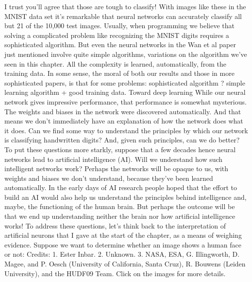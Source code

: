 I trust you'll agree that those are tough to classify! With images like these in the MNIST data set it's remarkable that neural networks can accurately classify all but 21 of the 10,000 test images. Usually, when programming we believe that solving a complicated problem like recognizing the MNIST digits requires a sophisticated algorithm. But even the neural networks in the Wan et al paper just mentioned involve quite simple algorithms, variations on the algorithm we've seen in this chapter. All the complexity is learned, automatically, from the training data. In some sense, the moral of both our results and those in more sophisticated papers, is that for some problems: 
sophisticated algorithm ? simple learning algorithm + good training data. 
Toward deep learning
While our neural network gives impressive performance, that performance is somewhat mysterious. The weights and biases in the network were discovered automatically. And that means we don't immediately have an explanation of how the network does what it does. Can we find some way to understand the principles by which our network is classifying handwritten digits? And, given such principles, can we do better?
To put these questions more starkly, suppose that a few decades hence neural networks lead to artificial intelligence (AI). Will we understand how such intelligent networks work? Perhaps the networks will be opaque to us, with weights and biases we don't understand, because they've been learned automatically. In the early days of AI research people hoped that the effort to build an AI would also help us understand the principles behind intelligence and, maybe, the functioning of the human brain. But perhaps the outcome will be that we end up understanding neither the brain nor how artificial intelligence works!
To address these questions, let's think back to the interpretation of artificial neurons that I gave at the start of the chapter, as a means of weighing evidence. Suppose we want to determine whether an image shows a human face or not:
Credits: 1. Ester Inbar. 2. Unknown. 3. NASA, ESA, G. Illingworth, D. Magee, and P. Oesch (University of California, Santa Cruz), R. Bouwens (Leiden University), and the HUDF09 Team. Click on the images for more details.


